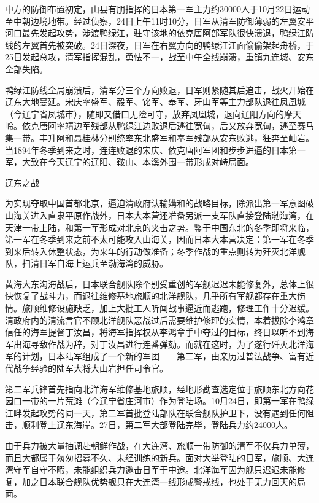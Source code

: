 \documentclass[12pt,UTF8]{ctexbook}
\begin{document}
中方的防御布置初定，山县有朋指挥的日本第一军主力约30000人于10月22日运动至中朝边境地带。经过侦察，24日上午11时10分，日军从清军防御薄弱的左翼安平河口最先发起攻势，涉渡鸭绿江，驻守该地的依克唐阿部军队很快溃退，鸭绿江防线的左翼首先被突破。24日深夜，日军在右翼方向的鸭绿江江面偷偷架起舟桥，于25日发起总攻，清军指挥混乱，勇怯不一，战至中午全线崩溃，重镇九连城、安东全部失陷。

鸭绿江防线全局崩溃后，清军分三个方向败退，日军则紧随其后追击，战火开始在辽东大地蔓延。宋庆率盛军、毅军、铭军、奉军、牙山军等主力部队退往凤凰城（今辽宁省凤城市），随即又借口无险可守，放弃凤凰城，退向辽阳方向的摩天岭。依克唐阿率靖边军残部从鸭绿江边败退后逃往宽甸，后又放弃宽甸，逃至赛马集一带。丰升阿和聂桂林分别统率东北盛军和奉军残部从安东败逃，狂奔至岫岩。当1894年冬季到来之时，连连败退的宋庆、依克唐阿军团和步步进逼的日本第一军，大致在今天辽宁的辽阳、鞍山、本溪外围一带形成对峙局面。

辽东之战

为实现夺取中国首都北京，逼迫清政府认输媾和的战略目标，除派出第一军意图破山海关进入直隶平原作战外，日本大本营还准备另派一支军队直接登陆渤海湾，在天津一带上陆，和第一军形成对北京的夹击之势。鉴于中国东北的冬季即将来临，第一军在冬季到来之前不太可能攻入山海关，因而日本大本营决定：第一军在冬季到来后转入休整状态，为来年的行动做准备；冬季作战的重点则转为歼灭北洋舰队，扫清日军自海上运兵至渤海湾的威胁。

黄海大东沟海战后，日本联合舰队除个别受重创的军舰迟迟未能修复外，总体上很快恢复了战斗力，而退往维修基地旅顺的北洋舰队，几乎所有军舰都存在重大伤情。旅顺维修设施缺乏，加上大批工人听闻战事逼近而逃跑，修理工作十分迟缓。清政府内的清流言官不顾北洋舰队恶战过后需要维护修理的实情，本着拔除李鸿章信任的海军提督丁汝昌，将海军指挥权从李鸿章手中夺过的目标，终日以听不到海军出海寻敌作战为辞，对丁汝昌进行连番弹劾。而就在这时，为了遂行歼灭北洋海军的计划，日本陆军组成了一个新的军团——第二军，由亲历过普法战争、富有近代战争经验的陆军大将大山岩担任司令官。

第二军兵锋首先指向北洋海军维修基地旅顺，经地形勘查选定位于旅顺东北方向花园口一带的一片荒滩（今辽宁省庄河市）作为登陆场。10月24日，即第一军在鸭绿江畔发起攻势的同一天，第二军首批登陆部队在联合舰队护卫下，没有遇到任何阻击，顺利登上辽东海岸。27日，第二军大部登陆完毕，登陆兵力约24000人。

由于兵力被大量抽调赴朝鲜作战，在大连湾、旅顺一带防御的清军不仅兵力单薄，而且大都属于匆匆招募不久、未经训练的新兵。面对大举登陆的日军，旅顺、大连湾守军自守不暇，未能组织兵力邀击日军于中途。北洋海军因为舰只迟迟未能修复，加之日本联合舰队优势舰只在大连湾一线形成警戒线，也处于无力回天的局面。
\end{document}
